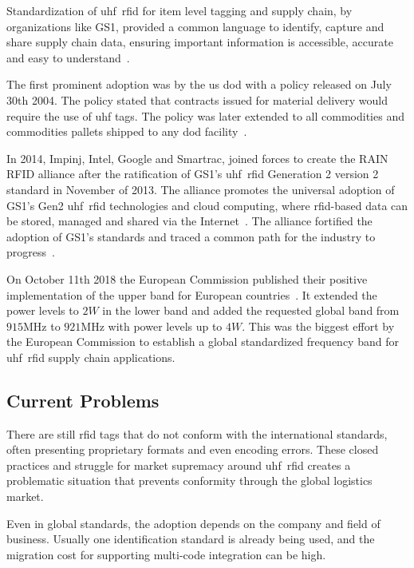 Standardization of \acs{uhf}~\acs{rfid} for item level tagging and supply chain, by organizations like GS1, provided a common language to identify, capture and share supply chain data, ensuring important information is accessible, accurate and easy to understand~\cite{anonymousStandardsGS12014}.

The first prominent adoption was by the \ac{us} \ac{dod} with a policy released on July 30th 2004. The policy stated that contracts issued for material delivery would require the use of \ac{uhf} tags. The policy was later extended to all commodities and commodities pallets shipped to any \ac{dod} facility~\cite{DoDSuppliersPassive, DODReleasesFinal}.

In 2014, Impinj, Intel, Google and Smartrac, joined forces to create the RAIN RFID alliance after the ratification of GS1's \acs{uhf}~\acs{rfid} Generation 2 version 2 standard in November of 2013. The alliance promotes the universal adoption of GS1's Gen2 \acs{uhf}~\acs{rfid} technologies and cloud computing, where \ac{rfid}-based data can be stored, managed and shared via the Internet~\cite{WhatRAINRFID}.
The alliance fortified the adoption of GS1's standards and traced a common path for the industry to progress~\cite{TechnologyCompaniesCreate}.

On October 11th 2018 the European Commission published their positive implementation of the upper band for European countries~\cite{302208v030101pPdf}.
It extended the power levels to $2W$ in the lower band and added the requested global band from $915$MHz to $921$MHz with power levels up to $4W$. 
This was the biggest effort by the European Commission to establish a global standardized frequency band for \acs{uhf}~\acs{rfid} supply chain applications.

\subsection{Current Problems} \label{sec:currentproblems}

There are still \ac{rfid} tags that do not conform with the international standards, often presenting proprietary formats and even encoding errors.
These closed practices and struggle for market supremacy around \acs{uhf}~\acs{rfid} creates a problematic situation that prevents conformity through the global logistics market.

Even in global standards, the adoption depends on the company and field of business. Usually one identification standard is already being used, and the migration cost for supporting multi-code integration can be high.

